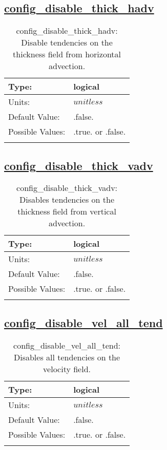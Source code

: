 \subsection[config\_disable\_thick\_hadv]{\hyperref[sec:nm_tab_debug]{config\_disable\_thick\_hadv}}
\label{subsec:nm_sec_config_disable_thick_hadv}
\begin{center}
\begin{longtable}{| p{2.0in} | p{4.0in} |}
    \hline
    Type: & logical \\
    \hline
    Units: & $unitless$ \\
    \hline
    Default Value: & .false. \\
    \hline
    Possible Values: & .true. or .false. \\
    \hline
    \caption{config\_disable\_thick\_hadv: Disable tendencies on the thickness field from horizontal advection.}
\end{longtable}
\end{center}
\subsection[config\_disable\_thick\_vadv]{\hyperref[sec:nm_tab_debug]{config\_disable\_thick\_vadv}}
\label{subsec:nm_sec_config_disable_thick_vadv}
\begin{center}
\begin{longtable}{| p{2.0in} | p{4.0in} |}
    \hline
    Type: & logical \\
    \hline
    Units: & $unitless$ \\
    \hline
    Default Value: & .false. \\
    \hline
    Possible Values: & .true. or .false. \\
    \hline
    \caption{config\_disable\_thick\_vadv: Disables tendencies on the thickness field from vertical advection.}
\end{longtable}
\end{center}
\subsection[config\_disable\_vel\_all\_tend]{\hyperref[sec:nm_tab_debug]{config\_disable\_vel\_all\_tend}}
\label{subsec:nm_sec_config_disable_vel_all_tend}
\begin{center}
\begin{longtable}{| p{2.0in} | p{4.0in} |}
    \hline
    Type: & logical \\
    \hline
    Units: & $unitless$ \\
    \hline
    Default Value: & .false. \\
    \hline
    Possible Values: & .true. or .false. \\
    \hline
    \caption{config\_disable\_vel\_all\_tend: Disables all tendencies on the velocity field.}
\end{longtable}
\end{center}
